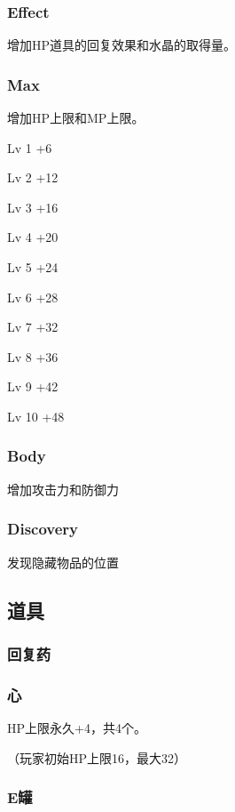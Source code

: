 \documentclass{article}
\begin{document}
\subsubsection{Effect}

增加HP道具的回复效果和水晶的取得量。

\subsubsection{Max}

增加HP上限和MP上限。

Lv 1 +6

Lv 2 +12

Lv 3 +16

Lv 4 +20

Lv 5 +24

Lv 6 +28

Lv 7 +32

Lv 8 +36

Lv 9 +42

Lv 10 +48

\subsubsection{Body}

增加攻击力和防御力

\subsubsection{Discovery}

发现隐藏物品的位置


\subsection{道具}

\subsubsection{回复药}

\subsubsection{心}

HP上限永久+4，共4个。

（玩家初始HP上限16，最大32）

\subsubsection{E罐}
\end{document}
